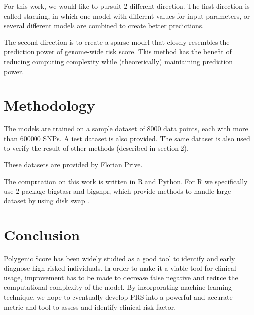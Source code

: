 \documentclass{article}
\begin{document}
For this work, we would like to pursuit 2 different direction. The first direction is 
called stacking, in which one model with different values for input parameters, 
or several different models are combined to create better predictions.

The second direction is to create a sparse model that closely resembles the prediction
power of genome-wide risk score. This method has the benefit of reducing computing complexity 
while (theoretically) maintaining prediction power.

\section{Methodology}

The models are trained on a sample dataset of 8000 data points, each with more than $600000$ SNPs. A
test dataset is also provided. The same dataset is also used to verify the result of other methods 
(described in section 2).

These datasets are provided by Florian Prive.

The computation on this work is written in R and Python. For R we specifically use 2 package bigstasr and bigsnpr,
which provide methods to handle large dataset by using disk swap \cite{bigsnpr}.

\section{Conclusion}

Polygenic Score has been widely studied as a good tool to identify and early
diagnose high risked individuals. In order to make it a viable tool for clinical usage,
improvement has to be made to decrease false negative and reduce the computational
complexity of the model. By incorporating machine learning technique, we hope to
eventually develop PRS into a powerful and accurate metric and tool to assess
and identify clinical risk factor.



\end{document}
